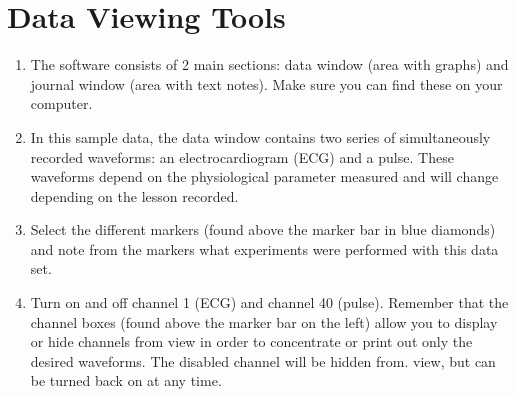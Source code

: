 \documentclass{article}
\begin{document}
\section*{Data Viewing Tools}
\begin{enumerate}
	\item The software consists of 2 main sections: data window (area with graphs) and journal window (area with text notes). Make sure you can find these on your computer.
	\item In this sample data, the data window contains two series of simultaneously recorded waveforms: an electrocardiogram (ECG) and a pulse. These waveforms depend on the physiological parameter measured and will change depending on the lesson recorded.
	\item Select the different markers (found above the marker bar in blue diamonds) and note from the markers what experiments were performed with this data set.
	\item Turn on and off channel 1 (ECG) and channel 40 (pulse). Remember that the channel boxes (found above the marker bar on the left) allow you to display or hide channels from view in order to concentrate or print out only the desired waveforms. The disabled channel will be hidden from. view, but can be turned back on at any time.
\end{enumerate}
\end{document}
